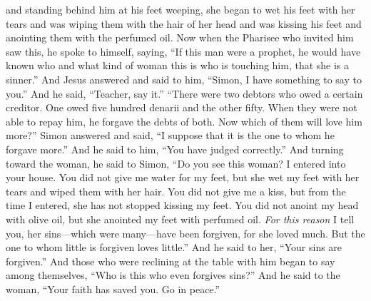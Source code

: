 \begin{biblechapter}
\verse and standing behind him at his feet weeping, she began to wet his feet with her tears and was wiping them with the hair of her head and was kissing his feet and anointing them with the perfumed oil.
\verse Now when the Pharisee who invited him saw this, he spoke to himself, saying, “If this man were a prophet, he would have known who and what kind of woman this is who is touching him, that she is a sinner.”
\verse And Jesus answered and said to him, “Simon, I have something to say to you.” And he said, “Teacher, say it.”
\verse “There were two debtors who owed a certain creditor. One owed five hundred denarii and the other fifty.
\verse When they were not able to repay him, he forgave the debts of both. Now which of them will love him more?”
\verse Simon answered and said, “I suppose that it is the one to whom he forgave more.” And he said to him, “You have judged correctly.”
\verse And turning toward the woman, he said to Simon, “Do you see this woman? I entered into your house. You did not give me water for my feet, but she wet my feet with her tears and wiped them with her hair.
\verse You did not give me a kiss, but from the time I entered, she has not stopped kissing my feet.
\verse You did not anoint my head with olive oil, but she anointed my feet with perfumed oil.
\verse \textit{For this reason} I tell you, her sins—which were many—have been forgiven, for she loved much. But the one to whom little is forgiven loves little.”
\verse And he said to her, “Your sins are forgiven.”
\verse And those who were reclining at the table with him began to say among themselves, “Who is this who even forgives sins?”
\verse And he said to the woman, “Your faith has saved you. Go in peace.”
\end{biblechapter}

